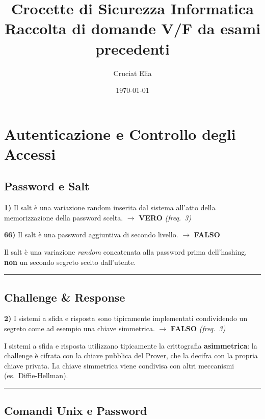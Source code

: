\documentclass[12pt, a4paper]{report}
\newcommand{\vero}{\textcolor{verdeanswer}{\textbf{VERO}}}
\newcommand{\falso}{\textcolor{rossoanswer}{\textbf{FALSO}}}
\newcommand{\freq}[1]{\textcolor{freqcolor}{\textit{(freq.\ #1)}}}
\begin{document}
\title{\textbf{Crocette di Sicurezza Informatica}\\[0.5em]
\large Raccolta di domande V/F da esami precedenti}
\author{Cruciat Elia}
\date{\today}

\maketitle

\tableofcontents
\newpage

\chapter{Autenticazione e Controllo degli Accessi}

\section{Password e Salt}

\noindent\textbf{1)} Il salt è una variazione random inserita dal sistema all'atto della memorizzazione della password scelta. $\to$ \vero{} \freq{3}

\smallskip
\noindent\textbf{66)} Il salt è una password aggiuntiva di secondo livello. $\to$ \falso{}

\medskip
\noindent Il salt è una variazione \textit{random} concatenata alla password prima dell'hashing, \textbf{non} un secondo segreto scelto dall'utente.

\noindent\rule{\textwidth}{0.4pt}

\section{Challenge \& Response}

\noindent\textbf{2)} I sistemi a sfida e risposta sono tipicamente implementati condividendo un segreto come ad esempio una chiave simmetrica. $\to$ \falso{} \freq{3}

\medskip
\noindent I sistemi a sfida e risposta utilizzano tipicamente la crittografia \textbf{asimmetrica}: la challenge è cifrata con la chiave pubblica del Prover, che la decifra con la propria chiave privata. La chiave simmetrica viene condivisa con altri meccanismi (es.\ Diffie-Hellman).

\noindent\rule{\textwidth}{0.4pt}

\section{Comandi Unix e Password}
\end{document}
